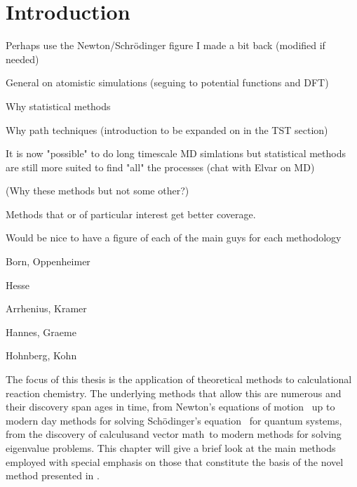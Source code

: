 \section{Introduction}
\label{sec:methods-introduction}


\bit
\item Perhaps use the Newton/Schr\"odinger figure I made a bit back (modified if needed)
\item General on atomistic simulations (seguing to potential functions and DFT)
\item Why statistical methods
\item Why path techniques (introduction to be expanded on in the TST section)
\item It is now "possible" to do long timescale MD simlations but statistical methods are still more suited to find "all" the processes (chat with Elvar on MD)
\item (Why these methods but not some other?)
\item Methods that or of particular interest get better coverage.

\item Would be nice to have a figure of each of the main guys for each methodology
\bit
\item Born, Oppenheimer
\item Hesse
\item Arrhenius, Kramer
\item Hannes, Graeme
\item Hohnberg, Kohn
\eit
\eit

The focus of this thesis is the application of theoretical methods to calculational reaction chemistry.
The underlying methods that allow this are numerous and their discovery span ages in time, from Newton's equations of motion~\cite{newton-latin} up to modern day methods for solving Sch\"odinger's equation~\cite{schrodinger-equation-1926} for quantum systems\cite{hohenberg-kohn-1964, gpaw-review-2010}, from the discovery of calculus\citemiss and vector math~\citemiss to modern methods for solving eigenvalue problems\citemiss.
This chapter will give a brief look at the main methods employed with special emphasis on those that constitute the basis of the novel method presented in .

